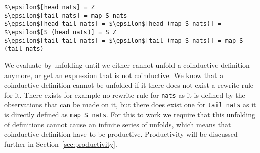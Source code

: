 \begin{Verbatim}[commandchars=\\\{\},codes={\catcode`$=3\catcode`_=8}]
$\epsilon$[head nats] = Z
$\epsilon$[tail nats] = map S nats
$\epsilon$[head tail nats] = $\epsilon$[head (map S nats)] = $\epsilon$[S (head nats)] = S Z
$\epsilon$[tail tail nats] = $\epsilon$[tail (map S nats)] = map S (tail nats)
\end{Verbatim}

We evaluate by unfolding until we either cannot unfold a coinductive definition anymore, or get an expression that is not coinductive. We know that a coinductive definition cannot be unfolded if it there does not exist a rewrite rule for it. There exists for example no rewrite rule for \texttt{nats} as it is defined by the observations that can be made on it, but there does exist one for \texttt{tail nats} as it is directly defined as \texttt{map S nats}. For this to work we require that this unfolding of definitions cannot cause an infinite series of unfolds, which means that coinductive definition have to be productive. Productivity will be discussed further in Section~\ref{sec:productivity}. 